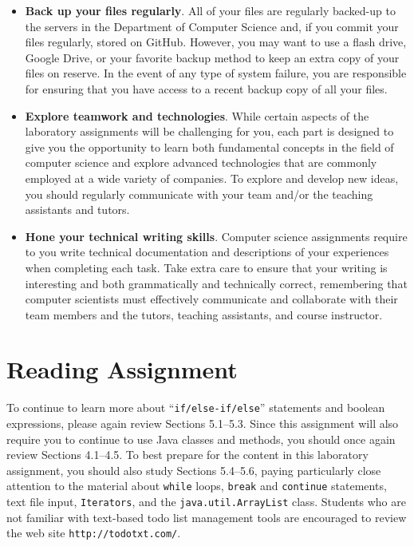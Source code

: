 \documentclass[11pt]{article}
\newcommand{\url}[1]{\lstinline{#1}}
\begin{document}
\begin{itemize}
\item {\bf Back up your files regularly}. All of your files are regularly backed-up to the servers in the Department of
  Computer Science and, if you commit your files regularly, stored on GitHub. However, you may want to use a flash
  drive, Google Drive, or your favorite backup method to keep an extra copy of your files on reserve. In the event of
  any type of system failure, you are responsible for ensuring that you have access to a recent backup copy of all your
  files.

\item {\bf Explore teamwork and technologies}. While certain aspects of the laboratory assignments will be challenging
  for you, each part is designed to give you the opportunity to learn both fundamental concepts in the field of computer
  science and explore advanced technologies that are commonly employed at a wide variety of companies. To explore and
  develop new ideas, you should regularly communicate with your team and/or the teaching assistants and tutors.

\item {\bf Hone your technical writing skills}. Computer science assignments require to you write technical
  documentation and descriptions of your experiences when completing each task. Take extra care to ensure that your
  writing is interesting and both grammatically and technically correct, remembering that computer scientists must
  effectively communicate and collaborate with their team members and the tutors, teaching assistants, and course
  instructor.


\end{itemize}

\section*{Reading Assignment}

To continue to learn more about ``{\tt if/else-if/else}'' statements and boolean expressions, please again review
Sections 5.1--5.3. Since this assignment will also require you to continue to use Java classes and methods, you should
once again review Sections 4.1--4.5. To best prepare for the content in this laboratory assignment, you should also
study Sections 5.4--5.6, paying particularly close attention to the material about {\tt while} loops, {\tt break} and
{\tt continue} statements, text file input, {\tt Iterators}, and the {\tt java.util.ArrayList} class. Students who are
not familiar with text-based todo list management tools are encouraged to review the web site \url{http://todotxt.com/}.
\end{document}
